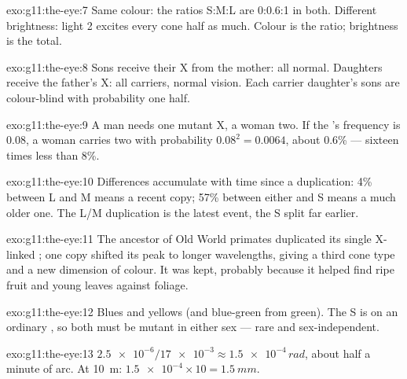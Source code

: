 \begin{solution}{exo:g11:the-eye:7}
Same colour: the ratios S:M:L are 0:0.6:1 in both. Different
brightness: light 2 excites every cone half as much. Colour is the
ratio; brightness is the total.
\end{solution}

\begin{solution}{exo:g11:the-eye:8}
Sons receive their X from the mother: all normal. Daughters receive
the father's X: all carriers, normal vision. Each carrier daughter's
sons are colour-blind with probability one half.
\end{solution}

\begin{solution}{exo:g11:the-eye:9}
A man needs one mutant X, a woman two. If the 's frequency is
0.08, a woman carries two with probability $0.08^2 = 0.0064$, about
0.6\% --- sixteen times less than 8\%.
\end{solution}

\begin{solution}{exo:g11:the-eye:10}
Differences accumulate with time since a duplication: 4\% between L
and M means a recent copy; 57\% between either and S means a much
older one. The L/M duplication is the latest event, the S split far
earlier.
\end{solution}

\begin{solution}{exo:g11:the-eye:11}
The ancestor of Old World primates duplicated its single X-linked
 ; one copy shifted its peak to longer wavelengths, giving a
third cone type and a new dimension of colour. It was kept, probably
because it helped find ripe fruit and young leaves against foliage.
\end{solution}

\begin{solution}{exo:g11:the-eye:12}
Blues and yellows (and blue-green from green). The S  is on an
ordinary , so both  must be mutant in either sex ---
rare and sex-independent.
\end{solution}

\begin{solution}{exo:g11:the-eye:13}
$\num{2.5e-6}/\num{17e-3} \approx \num{1.5e-4}\,\unit{rad}$, about
half a minute of arc. At \qty{10}{m}: $\num{1.5e-4} \times 10 =
\qty{1.5}{mm}$.
\end{solution}

